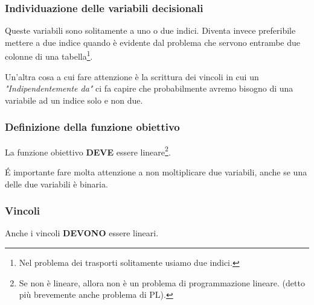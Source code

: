 \subsubsection{Individuazione delle variabili decisionali}
Queste variabili sono solitamente a uno o due indici.
Diventa invece preferibile mettere a due indice quando è evidente dal problema che servono entrambe due colonne di una tabella\footnote{Nel problema dei trasporti solitamente usiamo due indici.}.

Un'altra cosa a cui fare attenzione è la scrittura dei vincoli in cui un \textit{"Indipendentemente da"} ci fa capire che probabilmente avremo bisogno di una variabile ad un indice solo e non due.

\subsubsection{Definizione della funzione obiettivo}
La funzione obiettivo \textbf{DEVE} essere lineare\footnote{Se non è lineare, allora non è un problema di programmazione lineare. (detto più brevemente anche problema di PL).}.

É importante fare molta attenzione a non moltiplicare due variabili, anche se una delle due variabili è binaria.

\subsubsection{Vincoli}

Anche i vincoli \textbf{DEVONO} essere lineari.


